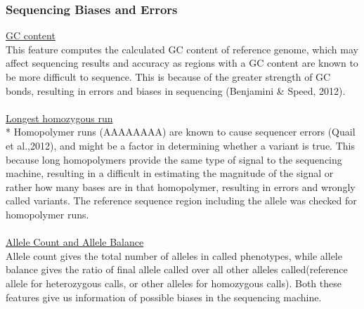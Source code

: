 \documentclass{article}
\begin{document}
\subsubsection{Sequencing Biases and Errors}
\underline{GC content}\\
This feature computes the calculated GC content of reference genome, which may affect sequencing results and accuracy as regions with a GC content are known to be more difficult to sequence. This is because of the greater strength of GC bonds, resulting in errors and biases in sequencing (Benjamini \& Speed, 2012).\\\\ 
\underline{Longest homozygous run}\\*
Homopolymer runs (AAAAAAAA) are known to cause sequencer errors (Quail et al.,2012), and might be a factor in determining whether a variant is true. This because long homopolymers provide the same type of signal to the sequencing machine, resulting in a difficult in estimating the magnitude of the signal or rather how many bases are in that homopolymer, resulting in errors and wrongly called variants. The reference sequence region including the allele was checked for homopolymer runs. \\\\
\underline{Allele Count and Allele Balance}\\
Allele count gives the total number of alleles in called phenotypes, while allele balance gives the ratio of final allele called over all other alleles called(reference allele for heterozygous calls, or other alleles for homozygous calls). Both these features give us information of possible biases in the sequencing machine.\\\\
\end{document}

